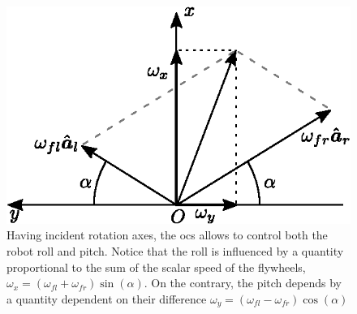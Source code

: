 \documentclass[letterpaper, 10 pt, conference]{ieeeconf}  %
\begin{document}
\begin{figure}
	\centering
	\includegraphics[width=.8\linewidth]{figures/sum_diff.eps}
	\caption{\small Having incident rotation axes, the \gls{ocs} allows to control both the robot roll and pitch. Notice that the roll is influenced by a quantity proportional to the sum of the scalar speed of the flywheels, $\omega_x = \left(\omega_{fl} +  \omega_{fr}\right)\sin(\alpha)$. On the contrary, the pitch depends by a quantity dependent on their difference $\omega_y = \left(\omega_{fl} -  \omega_{fr}\right)\cos(\alpha)$}
	\label{fig:sum-diff}
\end{figure}
\end{document}
